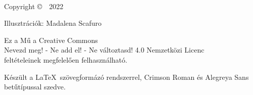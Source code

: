 \cleartoverso
\thispagestyle{empty}

{\copyrightsize
\centering
\setlength{\parindent}{0pt}%
\setlength{\parskip}{0.8\baselineskip}%

\thetitle\\
\theauthor

% 

Copyright \copyright\ \theauthor\ 2022

Illusztrációk: Madalena Scafuro

\vfill

\hspace*{-5mm}%
\parbox{\linewidth + 10mm}{%
\centering
Ez a Mű a Creative Commons\\
Nevezd meg! - Ne add el! - Ne változtasd! 4.0 Nemzetközi Licenc\\
feltételeinek megfelelően felhasználható.
}

Készült a \LaTeX\ szövegformázó rendszerrel, Crimson Roman és Alegreya Sans betűtípussal szedve.

\theEditionInfo

}

